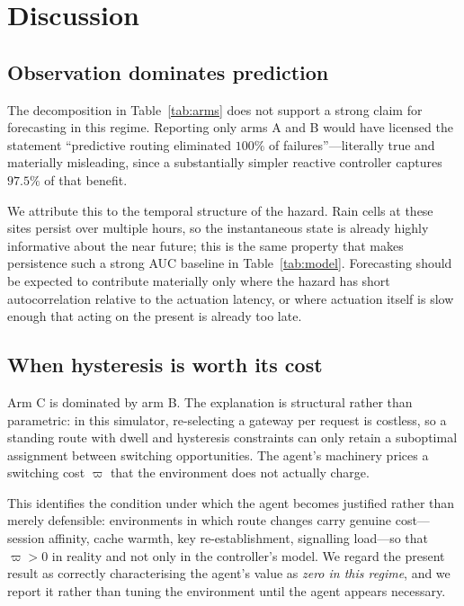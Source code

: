 \documentclass[10pt,twocolumn]{article}
\begin{document}
\section{Discussion}
\label{sec:discussion}

\subsection{Observation dominates prediction}

The decomposition in Table~\ref{tab:arms} does not support a strong claim for
forecasting in this regime. Reporting only arms A and B would have licensed the
statement ``predictive routing eliminated $100\%$ of failures''---literally true
and materially misleading, since a substantially simpler reactive controller
captures $97.5\%$ of that benefit.

We attribute this to the temporal structure of the hazard. Rain cells at these
sites persist over multiple hours, so the instantaneous state is already highly
informative about the near future; this is the same property that makes
persistence such a strong AUC baseline in Table~\ref{tab:model}. Forecasting
should be expected to contribute materially only where the hazard has short
autocorrelation relative to the actuation latency, or where actuation itself is
slow enough that acting on the present is already too late.

\subsection{When hysteresis is worth its cost}

Arm C is dominated by arm B. The explanation is structural rather than
parametric: in this simulator, re-selecting a gateway per request is costless,
so a standing route with dwell and hysteresis constraints can only retain a
suboptimal assignment between switching opportunities. The agent's machinery
prices a switching cost $\varpi$ that the environment does not actually charge.

This identifies the condition under which the agent becomes justified rather
than merely defensible: environments in which route changes carry genuine
cost---session affinity, cache warmth, key re-establishment, signalling
load---so that $\varpi>0$ in reality and not only in the controller's model. We
regard the present result as correctly characterising the agent's value as
\emph{zero in this regime}, and we report it rather than tuning the environment
until the agent appears necessary.
\end{document}
